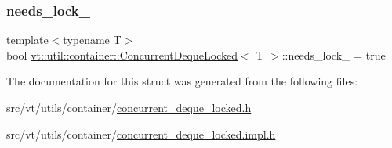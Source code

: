 \mbox{\label{structvt_1_1util_1_1container_1_1_concurrent_deque_locked_af681c689f7800fca7e35364aeffd9964}} 
\subsubsection{\texorpdfstring{needs\+\_\+lock\+\_\+}{needs\_lock\_}}
{\footnotesize\ttfamily template$<$typename T$>$ \\
bool \hyperlink{structvt_1_1util_1_1container_1_1_concurrent_deque_locked}{vt\+::util\+::container\+::\+Concurrent\+Deque\+Locked}$<$ T $>$\+::needs\+\_\+lock\+\_\+ = true\hspace{0.3cm}{\ttfamily [private]}}



The documentation for this struct was generated from the following files\+:\begin{DoxyCompactItemize}
\item 
src/vt/utils/container/\hyperlink{concurrent__deque__locked_8h}{concurrent\+\_\+deque\+\_\+locked.\+h}\item 
src/vt/utils/container/\hyperlink{concurrent__deque__locked_8impl_8h}{concurrent\+\_\+deque\+\_\+locked.\+impl.\+h}\end{DoxyCompactItemize}
